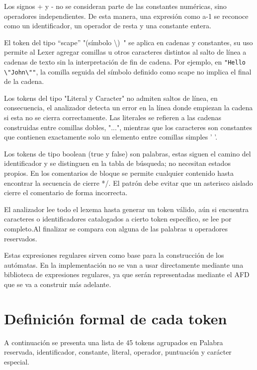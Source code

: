 \documentclass[12pt,letterpaper]{article}
\begin{document}
Los signos + y - no se consideran parte de las constantes numéricas, sino operadores independientes. De esta manera, una expresión como a-1 se reconoce como un identificador, un operador de resta y una constante entera.

El token del tipo “scape” "(símbolo \textbackslash)~" se aplica en cadenas y constantes, su uso permite al Lexer agregar comillas u otros caracteres distintos al salto de línea a cadenas de texto sin la interpretación de fin de cadena. Por ejemplo, en \texttt{"Hello \textbackslash"John\textbackslash""}, la comilla seguida del símbolo definido como scape no implica el final de la cadena.

Los tokens del tipo "Literal y Caracter" no admiten saltos de línea, en consecuencia, el analizador detecta un error en la línea donde empiezan la cadena si esta no se cierra correctamente. Las literales se refieren a las cadenas construidas entre comillas dobles, "...", mientras que los caracteres son constantes que contienen exactamente solo un elemento entre comillas simples ' '.

Los tokens de tipo boolean (true y false) son palabras, estas siguen el camino del identificador y se distinguen en la tabla de búsqueda; no necesitan estados propios. En los comentarios de bloque se permite cualquier contenido hasta encontrar la secuencia de cierre */. El patrón debe evitar que un asterisco aislado cierre el comentario de forma incorrecta.

El analizador lee todo el lexema hasta generar un token válido, aún si encuentra caracteres o identificadores catalogados a cierto token específico, se lee por completo.Al finalizar se compara con alguna de las palabras u operadores reservados.

Estas expresiones regulares sirven como base para la construcción de los autómatas. En la implementación no se van a usar directamente mediante una biblioteca de expresiones regulares, ya que serán representadas mediante el AFD que se va a construir más adelante.

\section{Definición formal de cada token}

A continuación se presenta una lista de 45 tokens agrupados en Palabra reservada, identificador, constante, literal, operador, puntuación y carácter especial.
\end{document}
